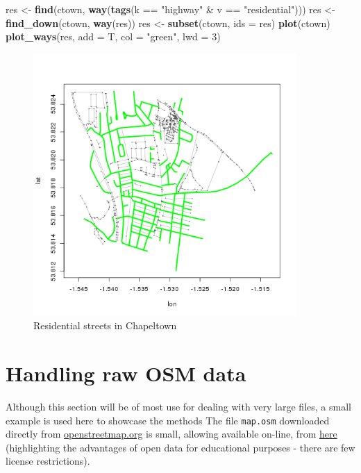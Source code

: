 \documentclass[]{article}
\newenvironment{Shaded}{}{}
\newcommand{\KeywordTok}[1]{\textcolor[rgb]{0.00,0.44,0.13}{\textbf{{#1}}}}
\newcommand{\DataTypeTok}[1]{\textcolor[rgb]{0.56,0.13,0.00}{{#1}}}
\newcommand{\DecValTok}[1]{\textcolor[rgb]{0.25,0.63,0.44}{{#1}}}
\newcommand{\StringTok}[1]{\textcolor[rgb]{0.25,0.44,0.63}{{#1}}}
\newcommand{\NormalTok}[1]{{#1}}
\let\Oldincludegraphics\includegraphics
\renewcommand{\includegraphics}[1]{\Oldincludegraphics[width=10cm]{#1}}
\begin{document}
\begin{Shaded}
\begin{Highlighting}[]
\NormalTok{res <- }\KeywordTok{find}\NormalTok{(ctown, }\KeywordTok{way}\NormalTok{(}\KeywordTok{tags}\NormalTok{(k == }\StringTok{"highway"} \NormalTok{& v == }\StringTok{"residential"}\NormalTok{)))}
\NormalTok{res <- }\KeywordTok{find_down}\NormalTok{(ctown, }\KeywordTok{way}\NormalTok{(res))}
\NormalTok{res <- }\KeywordTok{subset}\NormalTok{(ctown, }\DataTypeTok{ids =} \NormalTok{res)}
\KeywordTok{plot}\NormalTok{(ctown)}
\KeywordTok{plot_ways}\NormalTok{(res, }\DataTypeTok{add =} \NormalTok{T, }\DataTypeTok{col =} \StringTok{"green"}\NormalTok{, }\DataTypeTok{lwd =} \DecValTok{3}\NormalTok{)}
\end{Highlighting}
\end{Shaded}

\begin{figure}[htbp]
\centering
\includegraphics{figure/Residential_streets_in_Chapeltown.png}
\caption{Residential streets in Chapeltown}
\end{figure}

\section{Handling raw OSM data}

Although this section will be of most use for dealing with very large
files, a small example is used here to showcase the methods The file
\texttt{map.osm} downloaded directly from
\href{http://www.openstreetmap.org}{openstreetmap.org} is small,
allowing available on-line, from
\href{https://github.com/Robinlovelace/osm-tutorial/blob/master/data/map.osm?raw=true}{here}
(highlighting the advantages of open data for educational purposes -
there are few license restrictions).
\end{document}
